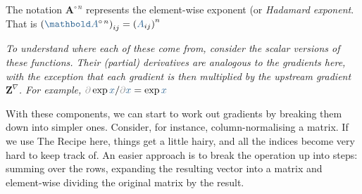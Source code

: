 \documentclass{pca}
\newenvironment{aside}{
	\setlength{\leftskip}{1em}\par\itshape
}{
	
	\setlength{\leftskip}{0em}\par
}
\newcommand{\bc}[1]{{\color{my-blue} #1}}
\newcommand{\kc}[1]{{\color{my-gray} #1}}
\newcommand{\mbA}{\mathbold A}
\newcommand{\mbZ}{\mathbold Z}
\newcommand{\kp}{\kc{\partial}}
\theoremstyle{theorem}
\theoremstyle{definition}
\theoremstyle{proof}
\begin{document}
The notation $\mbA^{\circ \,n}$ represents the element-wise exponent (or \emph{Hadamard exponent}. That is $\left (\bc{\mbA}^{\circ \, n} \right)_{ij} = \left ( \bc{A}_{ij} \right)^n$

\begin{aside}To understand where each of these come from, consider the scalar versions of these functions. Their (partial) derivatives are analogous to the gradients here, with the exception that each gradient is then multiplied by the upstream gradient $\mbZ^\nabla$. For example, $\kp \exp \bc{x} /\kp \bc{x} = \exp \bc{x} $
\end{aside}

With these components, we can start to work out gradients by breaking them down into simpler ones. Consider, for instance, column-normalising a matrix. If we use The Recipe here, things get a little hairy, and all the indices become very hard to keep track of. An easier approach is to break the operation up into steps: summing over the rows, expanding the resulting vector into a matrix and element-wise dividing the original matrix by the result.
\end{document}
